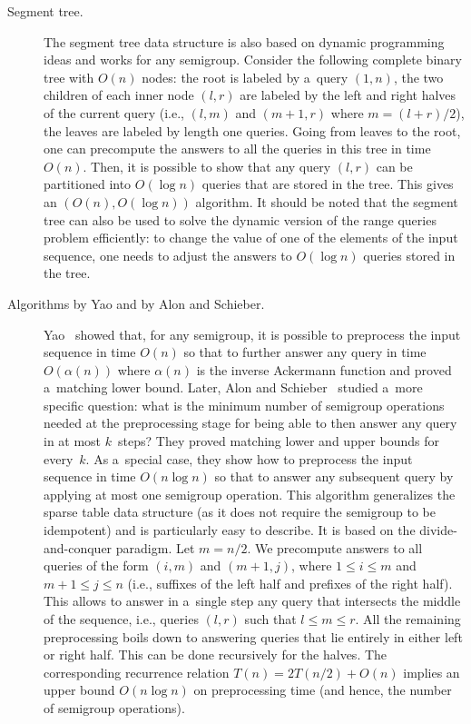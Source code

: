 \begin{description}
\item[Segment tree.] The segment tree data structure is also based on dynamic programming ideas and works for any semigroup. Consider the following complete binary tree with $O(n)$ nodes: the root is labeled by a~query $(1,n)$, the two children of each inner node $(l,r)$ are labeled by the left and right halves of the current query (i.e., $(l,m)$ and $(m+1,r)$ where $m=(l+r)/2$), the leaves are labeled by length one queries. Going from leaves to the root, one can precompute the answers to all the queries in this tree in time $O(n)$. Then, it is possible to show that any query $(l,r)$ can be  partitioned into $O(\log n)$ queries that are stored in the tree. This gives an $(O(n), O(\log n))$ algorithm. It should be noted that the segment tree can also be used to solve the dynamic version of the range queries problem efficiently: to change the value of one of the elements of the input sequence, one needs to adjust the answers to $O(\log n)$ queries stored in the tree.

\item[Algorithms by Yao and by Alon and Schieber.] Yao~\cite{DBLP:conf/stoc/Yao82} showed that, for any semigroup, it is possible to preprocess the input sequence in time $O(n)$ so that to further answer any query in time $O(\alpha(n))$ where $\alpha(n)$ is the inverse Ackermann function and proved a~matching lower bound. Later, Alon and Schieber~\cite{Alon87optimalpreprocessing} studied a~more specific question: what is the minimum number of semigroup operations needed at the preprocessing stage for being able to then answer any query in at most $k$~steps? They proved matching lower and upper bounds for every~$k$. As a~special case, they show how to preprocess the input sequence in time $O(n\log n)$ so that to answer any subsequent query by applying at most one semigroup operation. This algorithm generalizes the sparse table data structure (as it does not require the semigroup to be idempotent) and is particularly easy to describe. It is based on the divide-and-conquer paradigm. Let $m=n/2$. We precompute answers to all queries of the form $(i,m)$ and $(m+1,j)$, where $1 \le i \le m$ and $m+1 \le j \le n$ (i.e., suffixes of the left half and prefixes of the right half). This allows to answer in a~single step any query that intersects the middle of the sequence, i.e., queries $(l,r)$ such that $l \le m \le r$. All the remaining preprocessing boils down to answering queries that lie entirely in either left or right half. This can be done recursively for the halves. The corresponding recurrence relation $T(n)=2T(n/2)+O(n)$ implies an upper bound $O(n\log n)$ on preprocessing time (and hence, the number of semigroup operations).




\end{description}
